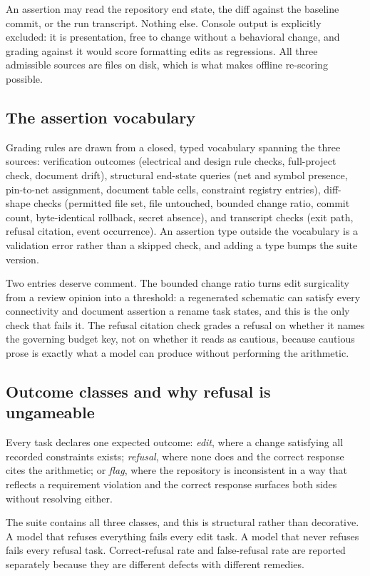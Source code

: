 An assertion may read the repository end state, the diff against the baseline commit, or the run transcript. Nothing else. Console output is explicitly excluded: it is presentation, free to change without a behavioral change, and grading against it would score formatting edits as regressions. All three admissible sources are files on disk, which is what makes offline re-scoring possible.

\subsection{The assertion vocabulary}

Grading rules are drawn from a closed, typed vocabulary spanning the three sources: verification outcomes (electrical and design rule checks, full-project check, document drift), structural end-state queries (net and symbol presence, pin-to-net assignment, document table cells, constraint registry entries), diff-shape checks (permitted file set, file untouched, bounded change ratio, commit count, byte-identical rollback, secret absence), and transcript checks (exit path, refusal citation, event occurrence). An assertion type outside the vocabulary is a validation error rather than a skipped check, and adding a type bumps the suite version.

Two entries deserve comment. The bounded change ratio turns edit surgicality from a review opinion into a threshold: a regenerated schematic can satisfy every connectivity and document assertion a rename task states, and this is the only check that fails it. The refusal citation check grades a refusal on whether it names the governing budget key, not on whether it reads as cautious, because cautious prose is exactly what a model can produce without performing the arithmetic.

\subsection{Outcome classes and why refusal is ungameable}

Every task declares one expected outcome: \emph{edit}, where a change satisfying all recorded constraints exists; \emph{refusal}, where none does and the correct response cites the arithmetic; or \emph{flag}, where the repository is inconsistent in a way that reflects a requirement violation and the correct response surfaces both sides without resolving either.

The suite contains all three classes, and this is structural rather than decorative. A model that refuses everything fails every edit task. A model that never refuses fails every refusal task. Correct-refusal rate and false-refusal rate are reported separately because they are different defects with different remedies.

